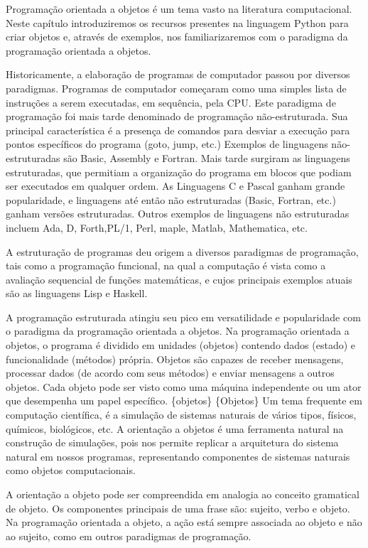 \documentclass[a4paper,10pt,brazil]{sphinxmanual}
\begin{document}
Programação orientada a objetos é um tema vasto na literatura computacional. Neste capítulo introduziremos os recursos presentes na linguagem Python para criar objetos e, através de exemplos, nos familiarizaremos com o paradigma da programação orientada a objetos.

Historicamente, a elaboração de programas de computador passou por diversos paradigmas. Programas de computador começaram como uma simples lista de instruções a serem executadas, em sequência, pela CPU. Este paradigma de programação foi mais tarde denominado de programação não-estruturada. Sua principal característica é a presença de comandos para desviar a execução para pontos específicos do programa (goto, jump, etc.) Exemplos de linguagens não-estruturadas são Basic, Assembly e Fortran. Mais tarde surgiram as linguagens estruturadas, que permitiam a organização do programa em blocos que podiam ser executados em qualquer ordem. As Linguagens C e Pascal ganham grande popularidade, e linguagens até então não estruturadas (Basic, Fortran, etc.) ganham versões estruturadas. Outros exemplos de linguagens não estruturadas incluem Ada, D, Forth,PL/1, Perl, maple, Matlab, Mathematica, etc.

A estruturação de programas deu origem a diversos paradigmas de programação, tais como a programação funcional, na qual a computação é vista como a avaliação sequencial de funções matemáticas, e cujos principais exemplos atuais são as linguagens Lisp e Haskell.

A programação estruturada atingiu seu pico em versatilidade e popularidade com o paradigma da programação orientada a objetos. Na programação orientada a objetos, o programa é dividido em unidades (objetos) contendo dados (estado) e funcionalidade (métodos) própria. Objetos são capazes de receber mensagens, processar dados (de acordo com seus métodos) e enviar mensagens a outros objetos. Cada objeto pode ser visto como uma máquina independente ou um ator que desempenha um papel específico. \{objetos\} \{Objetos\} Um tema frequente em computação científica, é a simulação de sistemas naturais de vários tipos, físicos, químicos, biológicos, etc. A orientação a objetos é uma ferramenta natural na construção de simulações, pois nos permite replicar a arquitetura do sistema natural em nossos programas, representando componentes de sistemas naturais como objetos computacionais.

A orientação a objeto pode ser compreendida em analogia ao conceito
gramatical de objeto. Os componentes principais de uma frase são:
sujeito, verbo e objeto. Na programação orientada a objeto, a ação
está sempre associada ao objeto e não ao sujeito, como em outros
paradigmas de programação.
\end{document}

